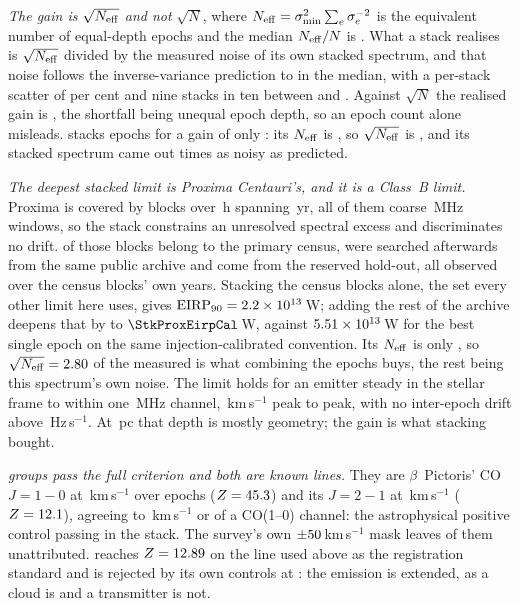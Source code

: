 \emph{The gain is $\sqrt{N_{\rm eff}}$ and not $\sqrt{N}$}, where
$N_{\rm eff}=\sigma_{\min}^{2}\sum_e\sigma_e^{-2}$ is the equivalent number of
equal-depth epochs and the median $N_{\rm eff}/N$ is \StkNeffFrac. What a
stack realises is $\sqrt{N_{\rm eff}}$ divided by the measured noise of its
own stacked spectrum, and that noise follows the inverse-variance prediction
to \StkGainVsNeff{} in the median, with a per-stack scatter of
\StkMadZScatterPct{} per cent and nine stacks in ten between \SzNoiseLo{} and
\SzNoiseHi. Against $\sqrt{N}$ the realised gain is \StkGainVsN, the
shortfall being unequal epoch depth, so an epoch count alone misleads.
\StkWorstStar{} stacks \StkWorstN{} epochs for a gain of only \StkWorstGain:
its $N_{\rm eff}$ is \StkWorstNeff, so $\sqrt{N_{\rm eff}}$ is
\SzWorstSqrtNeff, and its stacked spectrum came out \SzWorstNoise{} times as
noisy as predicted.

\emph{The deepest stacked limit is Proxima Centauri's, and it is a Class~B
limit.} Proxima is covered by \StkProxN{} blocks over \StkProxHours\,h
spanning \StkProxSpanYr\,yr, all of them coarse \ChanBModeMHz\,MHz windows,
so the stack constrains an unresolved spectral excess and discriminates no
drift. \SxProxEbCensus{} of those blocks belong to the primary census,
\SzProxEbSearched{} were searched afterwards from the same public archive and
\SzProxEbHold{} come from the reserved hold-out, all observed over the census
blocks' own years. Stacking the census blocks alone, the set every
other limit here uses, gives
$\mathrm{EIRP}_{90}=2.2\times10^{13}$\,W; adding the rest of the
archive deepens that by \SzProxDeepen{} to $\StkProxEirpCal$\,W, against
$5.51 \times 10^{13}$\,W for the best single epoch on the same
injection-calibrated convention. Its $N_{\rm eff}$ is only \StkProxNeff, so
$\sqrt{N_{\rm eff}}=2.80$ of the measured \StkProxGain{} is what
combining the epochs buys, the rest being this spectrum's own noise. The limit
holds for an emitter steady in the stellar frame to within one
\ChanBModeMHz\,MHz channel,
\StkProxTolKms\,km\,s$^{-1}$ peak to peak, with no inter-epoch drift above
\StkProxDriftHzS\,Hz\,s$^{-1}$. At \StkProxDistPc\,pc that depth is mostly
geometry; the gain is what stacking bought.

\emph{\StkNSurvive{} groups pass the full criterion and both are known
lines.} They are $\beta$~Pictoris' CO $J=1\!-\!0$ at
\StkBpCoOneOff\,km\,s$^{-1}$ over \StkBpCoOneN{} epochs ($Z=45.3$)
and its $J=2\!-\!1$ at \StkBpCoTwoOff\,km\,s$^{-1}$ ($Z=12.1$),
agreeing to \StkBpCrossKms\,km\,s$^{-1}$ or \StkBpCrossChan{} of a CO(1--0)
channel: the astrophysical positive control passing in the stack. The
survey's own $\pm50$\,km\,s$^{-1}$ mask leaves
\StkNUnattributedComputed{} of them unattributed. \StkPersistLineStar{} reaches
$Z=12.89$ on the line used above as the registration standard and is
rejected by its own controls at \StkPersistLineCtrl: the emission is extended,
as a cloud is and a transmitter is not.

